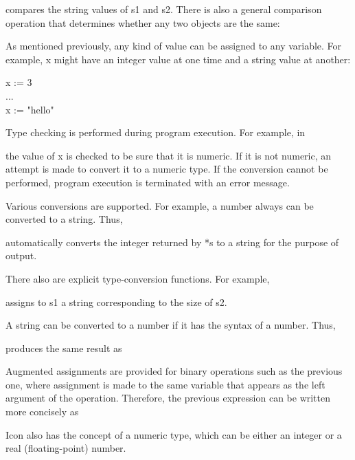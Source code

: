 
\noindent compares the string values of s1 and s2. There is also a
general comparison operation that determines whether any two objects
are the same:


As mentioned previously, any kind of value can be assigned to any
variable. For example, x might have an integer value at one time and a
string value at another:

\begin{iconcode}
\>x := 3 \\
\>... \\
\>x := "hello"
\end{iconcode}

Type checking is performed during program execution. For example, in


\noindent
the value of x is checked to be sure that it is numeric. If it is not
numeric, an attempt is made to convert it to a numeric type. If the
conversion cannot be performed, program execution is terminated with
an error message.

Various conversions are supported. For example, a number always can be
converted to a string. Thus,


\noindent automatically converts the integer returned by *s to a
string for the purpose of output.

There also are explicit type-conversion functions. For example,


\noindent assigns to s1 a string corresponding to the size of s2.

A string can be converted to a number if it has the syntax of a number. Thus,


\noindent produces the same result as


Augmented assignments are provided for binary operations such as the
previous one, where assignment is made to the same variable that
appears as the left argument of the operation. Therefore, the previous
expression can be written more concisely as


Icon also has the concept of a numeric type, which can be either an
integer or a real (floating-point) number.


